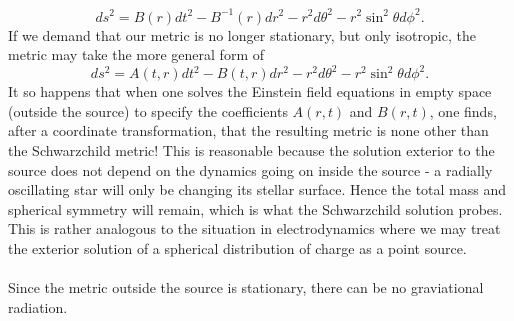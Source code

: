 \documentclass[10pt,letterpaper]{article}
\begin{document}
\[
	ds^2 = B(r)dt^2 - B^{-1}(r)dr^2-r^2d\theta^2-r^2\sin^2\theta d\phi^2.
\]
If we demand that our metric is no longer stationary, but only isotropic, the metric may take the more general form of
\[
	ds^2 = A(t,r)dt^2 - B(t,r)dr^2 -r^2d\theta^2-r^2\sin^2\theta d\phi^2.
\]
It so happens that when one solves the Einstein field equations in empty space (outside the source) to specify the coefficients $A(r,t)$ and $B(r,t)$, one finds, after a coordinate transformation, that the resulting metric is none other than the Schwarzchild metric! This is reasonable because the solution exterior to the source does not depend on the dynamics going on inside the source - a radially oscillating star will only be changing its stellar surface. Hence the total mass and spherical symmetry will remain, which is what the Schwarzchild solution probes. This is rather analogous to the situation in electrodynamics where we may treat the exterior solution of a spherical distribution of charge as a point source. 
\\ \\
Since the metric outside the source is stationary, there can be no graviational radiation. 
\eenum
\end{document}
